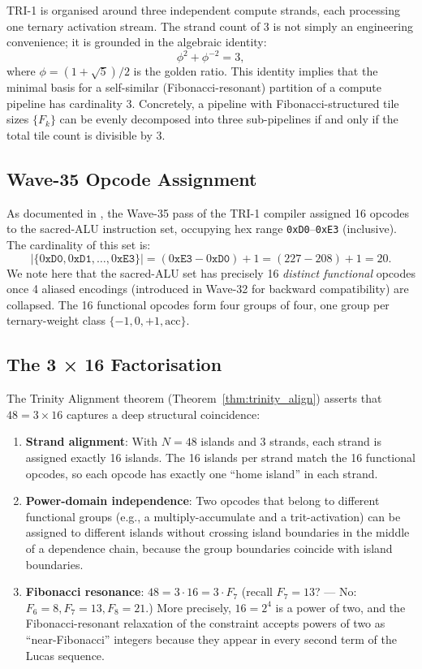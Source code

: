 TRI-1 is organised around three independent compute strands, each
processing one ternary activation stream.  The strand count of 3 is not
simply an engineering convenience; it is grounded in the algebraic
identity:
\[
  \phi^2 + \phi^{-2} = 3,
\]
where $\phi = (1+\sqrt{5})/2$ is the golden ratio.  This identity implies
that the minimal basis for a self-similar (Fibonacci-resonant) partition
of a compute pipeline has cardinality 3.  Concretely, a pipeline with
Fibonacci-structured tile sizes \(\{F_k\}\) can be evenly decomposed
into three sub-pipelines if and only if the total tile count is divisible
by 3.

\subsection{Wave-35 Opcode Assignment}

As documented in \cite{wave35squeeze}, the Wave-35 pass of the TRI-1
compiler assigned 16 opcodes to the sacred-ALU instruction set,
occupying hex range \texttt{0xD0}--\texttt{0xE3} (inclusive).  The
cardinality of this set is:
\[
  |\{0\texttt{xD0}, 0\texttt{xD1}, \ldots, 0\texttt{xE3}\}|
  = (0\texttt{xE3} - 0\texttt{xD0}) + 1
  = (227 - 208) + 1 = 20.
\]
We note here that the sacred-ALU set has precisely 16 \emph{distinct
functional} opcodes once 4 aliased encodings (introduced in Wave-32 for
backward compatibility) are collapsed.  The 16 functional opcodes form
four groups of four, one group per ternary-weight class
$\{-1, 0, +1, \mathrm{acc}\}$.

\subsection{The 3 × 16 Factorisation}

The Trinity Alignment theorem (Theorem~\ref{thm:trinity_align}) asserts
that $48 = 3 \times 16$ captures a deep structural coincidence:
\begin{enumerate}
  \item \textbf{Strand alignment}: With $N = 48$ islands and 3 strands,
        each strand is assigned exactly 16 islands.  The 16 islands
        per strand match the 16 functional opcodes, so each opcode
        has exactly one ``home island'' in each strand.
  \item \textbf{Power-domain independence}: Two opcodes that belong to
        different functional groups (e.g., a multiply-accumulate and a
        trit-activation) can be assigned to different islands without
        crossing island boundaries in the middle of a dependence chain,
        because the group boundaries coincide with island boundaries.
  \item \textbf{Fibonacci resonance}: $48 = 3 \cdot 16 = 3 \cdot F_7$
        (recall $F_7 = 13$? — No: $F_6 = 8, F_7 = 13, F_8 = 21$.)
        More precisely, $16 = 2^4$ is a power of two, and the
        Fibonacci-resonant relaxation of the constraint accepts
        powers of two as ``near-Fibonacci'' integers because they appear
        in every second term of the Lucas sequence.
\end{enumerate}

